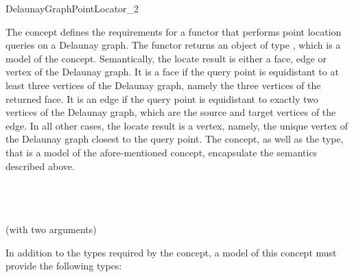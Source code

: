 
\begin{ccRefFunctionObjectConcept}{DelaunayGraphPointLocator_2}

The  concept defines the requirements
for a functor that performs point location queries on a Delaunay
graph. The functor returns an object of type , which
is a model of the 
concept. Semantically, the locate result is either a face, edge or
vertex of the Delaunay graph. It is a face if the query point is
equidistant to at least three vertices of the Delaunay graph, namely
the three vertices of the returned face. It is an edge if the query
point is equidistant to exactly two vertices of the Delaunay graph,
which are the source and target vertices of the edge. In all other
cases, the locate result is a vertex, namely, the unique vertex of the
Delaunay graph closest to the query point. The
 concept, as well as the
 type, that is a model of the afore-mentioned concept,
encapsulate the semantics described above.

\ccRefines
{}\\
\\
\\
 (with two arguments)

\ccTypes

In addition to the types required by the 
concept, a model of this concept must provide the following types:


\ccGlue
{}
{}
\ccThreeToTwo
{}
\ccGlue
{}
\ccGlue
{}
\ccGlue
{}


\end{ccRefFunctionObjectConcept}
